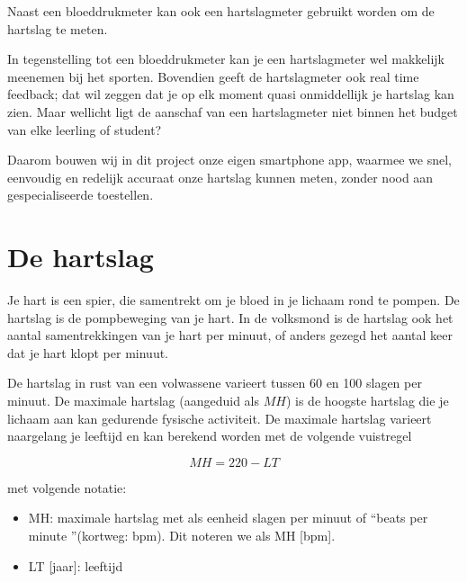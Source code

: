 Naast een bloeddrukmeter kan ook een hartslagmeter gebruikt worden om de hartslag te meten. 

\begin{minipage}{.5\linewidth}
\end{minipage} 
\begin{minipage}{.5\linewidth}
\end{minipage} 

In tegenstelling tot een bloeddrukmeter kan je een hartslagmeter wel makkelijk meenemen bij het sporten. Bovendien geeft de hartslagmeter ook real time feedback; dat wil zeggen dat je op elk moment quasi onmiddellijk je hartslag kan zien. Maar wellicht ligt de aanschaf van een hartslagmeter niet binnen het budget van elke leerling of student?

Daarom bouwen wij in dit project onze eigen smartphone app, waarmee we snel, eenvoudig en redelijk accuraat onze hartslag kunnen meten, zonder nood aan gespecialiseerde toestellen.


\section{De hartslag}
\label{sec:Mod1_Sec2}

Je hart is een spier, die samentrekt om je bloed in je lichaam rond te pompen. De hartslag is de pompbeweging van je hart. In de volksmond is de hartslag ook het aantal samentrekkingen van je hart per minuut, of anders gezegd het aantal keer dat je hart klopt per minuut.

De hartslag in rust van een volwassene varieert tussen 60 en 100 slagen per minuut. De maximale hartslag (aangeduid als $MH$) is de hoogste hartslag die je lichaam aan kan gedurende fysische activiteit. De maximale hartslag varieert naargelang je leeftijd en kan berekend worden met de volgende vuistregel

\begin{equation*}
MH = 220-LT
\end{equation*}

met volgende notatie:
\begin{itemize}
	\item MH: maximale hartslag met als eenheid slagen per minuut of \textquotedblleft beats per minute \textquotedblright (kortweg: bpm). 
	Dit noteren we als MH [bpm].
	\item LT [jaar]: leeftijd
\end{itemize}

